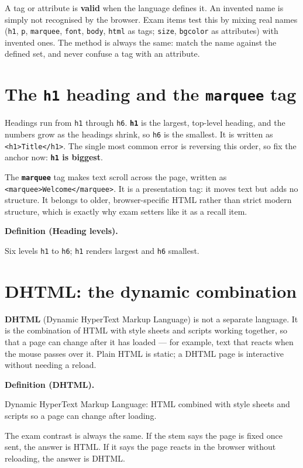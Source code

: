 \documentclass[11pt]{article}
\newenvironment{definitionbox}[1]{%
  \par\noindent\textbf{Definition (#1).}\ \itshape
}{\par\vspace{0.3em}}
\begin{document}
A tag or attribute is \textbf{valid} when the language defines it. An invented name is simply not recognised by the browser. Exam items test this by mixing real names (\texttt{h1}, \texttt{p}, \texttt{marquee}, \texttt{font}, \texttt{body}, \texttt{html} as tags; \texttt{size}, \texttt{bgcolor} as attributes) with invented ones. The method is always the same: match the name against the defined set, and never confuse a tag with an attribute.

\section{The \texttt{h1} heading and the \texttt{marquee} tag}
Headings run from \texttt{h1} through \texttt{h6}. \textbf{\texttt{h1}} is the largest, top-level heading, and the numbers grow as the headings shrink, so \texttt{h6} is the smallest. It is written as \texttt{<h1>Title</h1>}. The single most common error is reversing this order, so fix the anchor now: \textbf{\texttt{h1} is biggest}.

The \textbf{\texttt{marquee}} tag makes text scroll across the page, written as \texttt{<marquee>Welcome</marquee>}. It is a presentation tag: it moves text but adds no structure. It belongs to older, browser-specific HTML rather than strict modern structure, which is exactly why exam setters like it as a recall item.

\begin{definitionbox}{Heading levels}
Six levels \texttt{h1} to \texttt{h6}; \texttt{h1} renders largest and \texttt{h6} smallest.
\end{definitionbox}

\section{DHTML: the dynamic combination}
\textbf{DHTML} (Dynamic HyperText Markup Language) is not a separate language. It is the combination of HTML with style sheets and scripts working together, so that a page can change after it has loaded --- for example, text that reacts when the mouse passes over it. Plain HTML is static; a DHTML page is interactive without needing a reload.

\begin{definitionbox}{DHTML}
Dynamic HyperText Markup Language: HTML combined with style sheets and scripts so a page can change after loading.
\end{definitionbox}

The exam contrast is always the same. If the stem says the page is fixed once sent, the answer is HTML. If it says the page reacts in the browser without reloading, the answer is DHTML.
\end{document}
